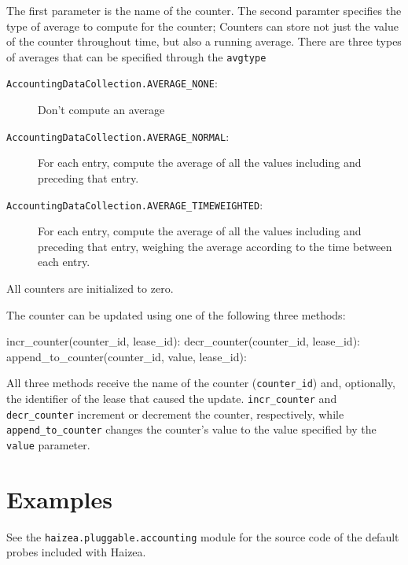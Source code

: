The first parameter is the name of the counter. The second paramter specifies the type of average to compute for the counter; Counters can store not just the value of the counter throughout time, but also a running average. There are three types of averages that can be specified through the \texttt{avgtype}
        
\begin{description}
\item[\texttt{AccountingDataCollection.AVERAGE\_NONE}:] Don't compute an average
\item[\texttt{AccountingDataCollection.AVERAGE\_NORMAL}:] For each entry, compute the average of all the values including and preceding that entry.
\item[\texttt{AccountingDataCollection.AVERAGE\_TIMEWEIGHTED}:]  For each entry, compute the average of all the values including and preceding that entry, weighing the average according to the time between each entry.
\end{description}

All counters are initialized to zero.

The counter can be updated using one of the following three methods:

\begin{wideshellverbatim}
incr_counter(counter_id, lease_id):
decr_counter(counter_id, lease_id):
append_to_counter(counter_id, value, lease_id):
\end{wideshellverbatim}

All three methods receive the name of the counter (\verb+counter_id+) and, optionally, the identifier of the lease that caused the update. \verb+incr_counter+ and \verb+decr_counter+ increment or decrement the counter, respectively, while \verb+append_to_counter+ changes the counter's value to the value specified by the \verb+value+ parameter.


\section{Examples}

See the \texttt{haizea.pluggable.accounting} module for the source code of the default probes included with Haizea.